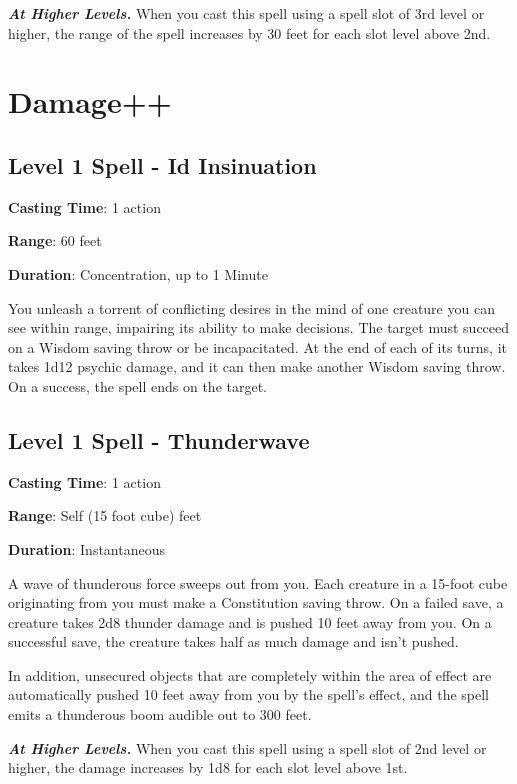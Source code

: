 \documentclass{article}
\begin{document}
\textbf{\textit{At Higher Levels.}} When you cast this spell using a spell slot of 3rd level or higher, the range of the spell increases by 30 feet for each slot level above 2nd.

\section{Damage++}
\subsection{Level 1 Spell - Id Insinuation}
\noindent\textbf{Casting Time}: 1 action

\noindent\textbf{Range}: 60 feet

\noindent\textbf{Duration}: Concentration, up to 1 Minute

You unleash a torrent of conflicting desires in the mind of one creature you can see within range, impairing its ability to make decisions. The target must succeed on a Wisdom saving throw or be incapacitated. At the end of each of its turns, it takes 1d12 psychic damage, and it can then make another Wisdom saving throw. On a success, the spell ends on the target.

\subsection{Level 1 Spell - Thunderwave}
\noindent\textbf{Casting Time}: 1 action

\noindent\textbf{Range}: Self (15 foot cube) feet

\noindent\textbf{Duration}: Instantaneous

A wave of thunderous force sweeps out from you. Each creature in a 15-foot cube originating from you must make a Constitution saving throw. On a failed save, a creature takes 2d8 thunder damage and is pushed 10 feet away from you. On a successful save, the creature takes half as much damage and isn’t pushed.

In addition, unsecured objects that are completely within the area of effect are automatically pushed 10 feet away from you by the spell’s effect, and the spell emits a thunderous boom audible out to 300 feet.

\textbf{\textit{At Higher Levels.}} When you cast this spell using a spell slot of 2nd level or higher, the damage increases by 1d8 for each slot level above 1st.
\end{document}
